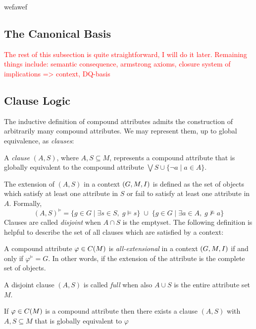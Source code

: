 \begin{corollary}
	\label{corollary:closure-system-intents} wefawef
\end{corollary}


\subsection{The Canonical Basis}
\label{subsection:the-canonical-basis}

\textcolor{red}{The rest of this subsection is quite straightforward, I will do it later. Remaining things include: semantic
consequence, armstrong axioms, closure system of implications => context, DQ-basis}

\clearpage
\subsection{Clause Logic}
\label{subsection:clause-logic}

The inductive definition of compound attributes admits the construction of arbitrarily many compound attributes. We may represent
them, up to global equivalence, as \textit{clauses}:
\begin{definition}
	\label{definition:clauses}

	A \emph{clause} $(A,S)$, where $A,S \subseteq M$, represents a compound attribute that is globally equivalent to the compound
	attribute $\bigvee S \cup \{\neg a \mid a \in A\}$.
\end{definition}

The extension of $(A,S)$ in a context $(G,M,\mathrel{I})$ is defined as the set of objects which satisfy at least one attribute in
$S$ or fail to satisfy at least one attribute in $A$. Formally,
\[
	(A,S)^{\vDash}= \{ g \in G \mid \exists s \in S,\; g\vDash s \} \;\cup\; \{ g \in G \mid \exists a \in A,\; g \nvDash a
	\}
\]
Clauses are called \textit{disjoint} when $A \cap S$ is the emptyset. The following definition is helpful to describe
the set of all clauses which are satisfied by a context:
%
\begin{definition}
	\label{definition:all-extensional}

	A compound attribute $\varphi \in C(M)$ is \emph{all-extensional} in a context $(G,M,\mathrel{I})$ if and only if $\varphi^{\vDash}
	= G$. In other words, if the extension of the attribute is the complete set of objects.
\end{definition}

A disjoint clause $(A,S)$ is called \textit{full} when also $A \cup S$ is the entire attribute set $M$.
\begin{proposition}
	\label{proposition:clause-up-to-equivalence}

	If $\varphi \in C(M)$ is a compound attribute then there exists a clause $(A,S)$ with $A,S \subseteq M$ that is
	globally equivalent to $\varphi$
\end{proposition}

